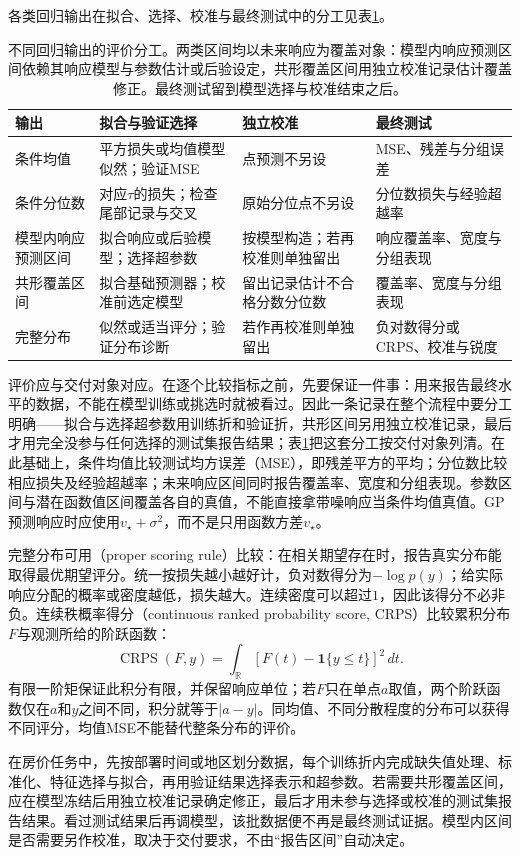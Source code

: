 各类回归输出在拟合、选择、校准与最终测试中的分工见表\ref{tab:regression-evaluation-protocol}。

\begin{table}[htbp]
  \centering
  \small
  \begin{tabularx}{\linewidth}{@{}>{\RaggedRight\arraybackslash}p{22mm}>{\RaggedRight\arraybackslash}X>{\RaggedRight\arraybackslash}X>{\RaggedRight\arraybackslash}X@{}}
    \toprule
    输出 & 拟合与验证选择 & 独立校准 & 最终测试 \\
    \midrule
    条件均值 & 平方损失或均值模型似然；验证MSE & 点预测不另设 & MSE、残差与分组误差 \\
    条件分位数 & 对应$\tau$的损失；检查尾部记录与交叉 & 原始分位点不另设 & 分位数损失与经验超越率 \\
    模型内响应预测区间 & 拟合响应或后验模型；选择超参数 & 按模型构造；若再校准则单独留出 & 响应覆盖率、宽度与分组表现 \\
    共形覆盖区间 & 拟合基础预测器；校准前选定模型 & 留出记录估计不合格分数分位数 & 覆盖率、宽度与分组表现 \\
    完整分布 & 似然或适当评分；验证分布诊断 & 若作再校准则单独留出 & 负对数得分或CRPS、校准与锐度 \\
    \bottomrule
  \end{tabularx}
  \caption{不同回归输出的评价分工。两类区间均以未来响应为覆盖对象：模型内响应预测区间依赖其响应模型与参数估计或后验设定，共形覆盖区间用独立校准记录估计覆盖修正。最终测试留到模型选择与校准结束之后。}
  \label{tab:regression-evaluation-protocol}
\end{table}

评价应与交付对象对应。在逐个比较指标之前，先要保证一件事：用来报告最终水平的数据，不能在模型训练或挑选时就被看过。因此一条记录在整个流程中要分工明确——拟合与选择超参数用训练折和验证折，共形区间另用独立校准记录，最后才用完全没参与任何选择的测试集报告结果；表\ref{tab:regression-evaluation-protocol}把这套分工按交付对象列清。在此基础上，条件均值比较测试均方误差（MSE），即残差平方的平均；分位数比较相应损失及经验超越率；未来响应区间同时报告覆盖率、宽度和分组表现。参数区间与潜在函数值区间覆盖各自的真值，不能直接拿带噪响应当条件均值真值。GP预测响应时应使用$v_\star+\sigma^2$，而不是只用函数方差$v_\star$。

完整分布可用（proper scoring rule）比较：在相关期望存在时，报告真实分布能取得最优期望评分。统一按损失越小越好计，负对数得分为$-\log p(y)$；给实际响应分配的概率或密度越低，损失越大。连续密度可以超过$1$，因此该得分不必非负。连续秩概率得分（continuous ranked probability score, CRPS）比较累积分布$F$与观测所给的阶跃函数：
\begin{equation}
 \operatorname{CRPS}(F,y)=\int_{\mathbb R}
        [F(t)-\mathbf1\{y\leq t\}]^2\,dt.
 \label{eq:regression-crps}
\end{equation}
有限一阶矩保证此积分有限，并保留响应单位；若$F$只在单点$a$取值，两个阶跃函数仅在$a$和$y$之间不同，积分就等于$|a-y|$。同均值、不同分散程度的分布可以获得不同评分，均值MSE不能替代整条分布的评价。

在房价任务中，先按部署时间或地区划分数据，每个训练折内完成缺失值处理、标准化、特征选择与拟合，再用验证结果选择表示和超参数。若需要共形覆盖区间，应在模型冻结后用独立校准记录确定修正，最后才用未参与选择或校准的测试集报告结果。看过测试结果后再调模型，该批数据便不再是最终测试证据。模型内区间是否需要另作校准，取决于交付要求，不由“报告区间”自动决定。
